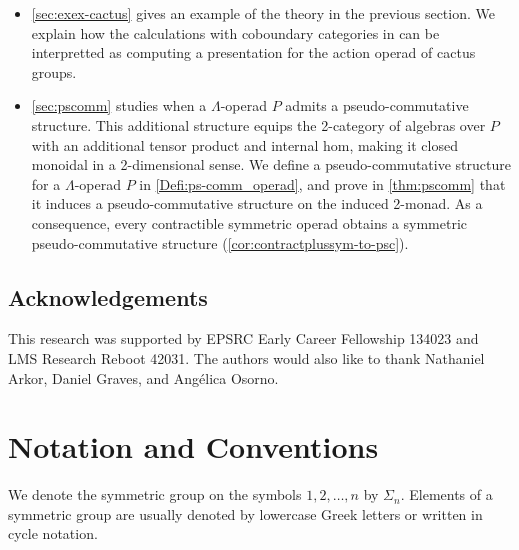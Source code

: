 \begin{itemize}
\item \cref{sec:exex-cactus} gives an example of the theory in the previous section. We explain how the calculations with coboundary categories in \cite{hk-cobound} can be interpretted as computing a presentation for the action operad of cactus groups.
\item \cref{sec:pscomm} studies when a $\Lambda$-operad $P$ admits a pseudo-commutative structure. This additional structure equips the 2-category of algebras over $P$ with an additional tensor product and internal hom, making it closed monoidal in a 2-dimensional sense. We define a pseudo-commutative structure for a $\Lambda$-operad $P$ in \cref{Defi:ps-comm_operad}, and prove in \cref{thm:pscomm} that it induces a pseudo-commutative structure on the induced 2-monad. As a consequence, every contractible symmetric operad obtains a symmetric pseudo-commutative structure (\cref{cor:contractplussym-to-psc}).
\end{itemize}

\subsection*{Acknowledgements}
This research was supported by EPSRC Early Career Fellowship 134023 and LMS Research Reboot 42031.
The authors would also like to thank Nathaniel Arkor,  Daniel Graves, and Ang\'elica Osorno.

\section{Notation and Conventions}\label{sec:notation}

\begin{nota}\label{nota:symm_sigma}
We denote the symmetric group on the symbols $1, 2, \ldots, n$ by $\Sigma_n$. Elements of a symmetric group are usually denoted by lowercase Greek letters or written in cycle notation.
\end{nota}



